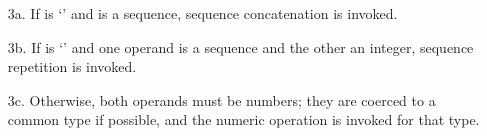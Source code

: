 \begin{itemize}
        \begin{itemize}

        \item[3a.] If  is `\code{+}' and  is a
        sequence, sequence concatenation is invoked.

        \item[3b.] If  is `\code{*}' and one operand is a
        sequence and the other an integer, sequence repetition is
        invoked.

        \item[3c.] Otherwise, both operands must be numbers; they are
        coerced to a common type if possible, and the numeric
        operation is invoked for that type.

        \end{itemize}

\end{itemize}
